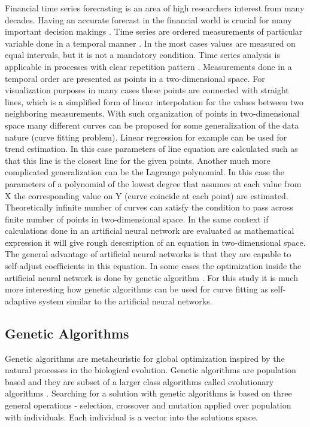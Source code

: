 \documentclass[graybox]{svmult}
\begin{document}
Financial time series forecasting is an area of high researchers interest \cite{nava01} from many decades. Having an accurate forecast in the financial world is crucial for many important decision makings \cite{catania01}. Time series are ordered measurements of particular variable done in a temporal manner \cite{chen01}. In the most cases values are measured on equal intervals, but it is not a mandatory condition. Time series analysis is applicable in processes with clear repetition pattern \cite{mueen01}. Measurements done in a temporal order are presented as points in a two-dimensional space. For visualization purposes in many cases these points are connected with straight lines, which is a simplified form of linear interpolation for the values between two neighboring measurements. With such organization of points in two-dimensional space many different curves can be proposed for some generalization of the data nature (curve fitting problem). Linear regression for example can be used for trend estimation. In this case parameters of line equation are calculated such as that this line is the closest line for the given points. Another much more complicated generalization can be the Lagrange polynomial. In this case the parameters of a polynomial of the lowest degree that assumes at each value from X the corresponding value on Y (curve coincide at each point) are estimated. Theoretically infinite number of curves can satisfy the condition to pass across finite number of points in two-dimensional space. In the same context if calculations done in an artificial neural network are evaluated as mathematical expression it will give rough descsription of an equation in two-dimensional space. The general advantage of artificial neural networks is that they are capable to self-adjust coefficients \cite{aljarah01} in this equation. In some cases the optimization inside the artificial neural network is done by genetic algorithm \cite{zhang01,kapanova01}. For this study it is much more interesting how genetic algorithms can be used for curve fitting as self-adaptive system similar to the artificial neural networks. 

\subsection{Genetic Algorithms} \label{Genetic Algorithms}

Genetic algorithms are metaheuristic for global optimization inspired by the natural processes in the biological evolution. Genetic algorithms are population based \cite{mirjalili01} and they are subset of a larger class algorithms called evolutionary algorithms \cite{liu01}. Searching for a solution with genetic algorithms is based on three general operations - selection, crossover and mutation applied over population with individuals. Each individual is a vector into the solutions space. 
\end{document}

